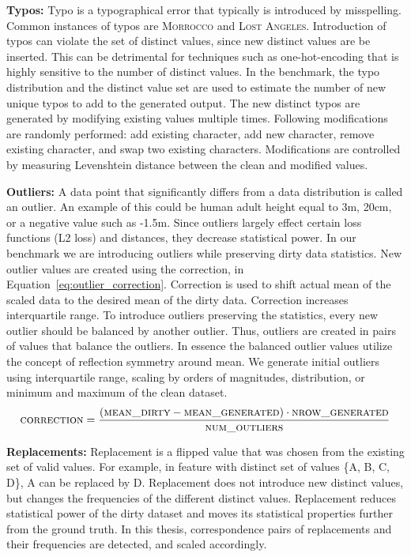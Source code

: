
\textbf{Typos:} 
Typo is a typographical error that typically is introduced by misspelling. 
Common instances of typos are \textsc{Morrocco} and \textsc{Lost Angeles}. 
Introduction of typos can violate the set of distinct values, since new distinct values are be inserted.
This can be detrimental for techniques such as one-hot-encoding that is highly sensitive to the number of distinct values.
In the benchmark, the typo distribution and the distinct value set are used to estimate the number of new unique typos to add to the generated output. 
The new distinct typos are generated by modifying existing values multiple times.
Following modifications are randomly performed: add existing character, add new character, remove existing character, and swap two existing characters.
Modifications are controlled by measuring Levenshtein distance between the clean and modified values. 

\textbf{Outliers:} 
A data point that significantly differs from a data distribution is called an outlier.
An example of this could be human adult height equal to 3m, 20cm, or a negative value such as -1.5m. 
Since outliers largely effect certain loss functions (L2 loss) and distances, they decrease statistical power.
In our benchmark we are introducing outliers while preserving dirty data statistics. 
New outlier values are created using the correction, in Equation~\ref{eq:outlier_correction}. 
Correction is used to shift actual mean of the scaled data to the desired mean of the dirty data.
Correction increases interquartile range.
To introduce outliers preserving the statistics, every new outlier should be balanced by another outlier. Thus, outliers are created in pairs of values that balance the outliers. 
In essence the balanced outlier values utilize the concept of reflection symmetry around mean.  
We generate initial outliers using interquartile range, scaling by orders of magnitudes, distribution, or minimum and maximum of the clean dataset.
\begin{equation}
\label{eq:outlier_correction}
\textsc{correction} = \frac{(\textsc{mean\_dirty} - \textsc{mean\_generated}) \cdot \textsc{nrow\_generated}}{\textsc{num\_outliers}}
\end{equation}

\textbf{Replacements:} 
Replacement is a flipped value that was chosen from the existing set of valid values. 
For example, in feature with distinct set of values \textsc{\{A, B, C, D\}}, \textsc{A} can be replaced by \textsc{D}. 
Replacement does not introduce new distinct values, but changes the frequencies of the different distinct values. 
Replacement reduces statistical power of the dirty dataset and moves its statistical properties further from the ground truth.
In this thesis, correspondence pairs of replacements and their frequencies are detected, and scaled accordingly. 

